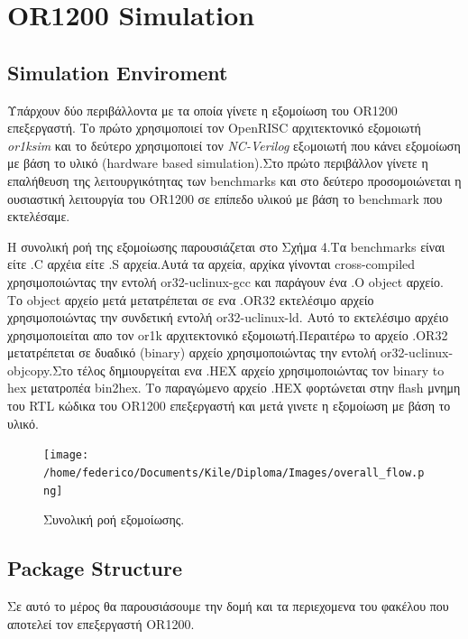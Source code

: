 \documentclass[a4paper,10pt]{article}
\numberwithin{figure}{subsection}
\numberwithin{table}{subsection}
\begin{document}
\section{OR1200 Simulation}{

\subsection{Simulation Enviroment}{
Υπάρχουν δύο περιβάλλοντα με τα οποία γίνετε η εξομοίωση του OR1200 επεξεργαστή.
Το πρώτο χρησιμοποιεί τον OpenRISC αρχιτεκτονικό εξομοιωτή \emph{or1ksim} και 
το δεύτερο χρησιμοποιεί τον \emph{NC-Verilog} εξoμοιωτή που κάνει εξομοίωση με βάση
το υλικό (hardware based simulation).Στο πρώτο περιβάλλον γίνετε η επαλήθευση
της λειτουργικότητας των benchmarks και στο δεύτερο προσομοιώνεται η ουσιαστική
λειτουργία του OR1200 σε επίπεδο υλικού με βάση το benchmark που εκτελέσαμε.\newline


Η συνολική ροή της εξομοίωσης παρουσιάζεται στο Σχήμα 4.Τα benchmarks είναι 
είτε .C αρχέια είτε .S αρχεία.Αυτά τα αρχεία, αρχίκα γίνονται cross-compiled
 χρησιμοποιώντας την εντολή or32-uclinux-gcc και παράγουν ένα .O object αρχείο.
Το object αρχείο μετά μετατρέπεται σε ενα .OR32 εκτελέσιμο αρχείο χρησιμοποιώντας
την συνδετική εντολή or32-uclinux-ld. Αυτό το εκτελέσιμο αρχέιο χρησιμοποιείται
απο τον or1k αρχιτεκτονικό εξομοιωτή.Περαιτέρω το αρχείο .OR32 μετατρέπεται σε
δυαδικό (binary) αρχείο χρησιμοποιώντας την εντολή or32-uclinux-objcopy.Στο τέλος
δημιουργείται ενα .HEX αρχείο χρησιμοποιώντας τον binary to hex μετατροπέα
 bin2hex. Το παραγώμενο αρχείο .HEX φορτώνεται στην flash μνημη του RTL κώδικα
του OR1200 επεξεργαστή και μετά γινετε η εξομοίωση με βάση το υλικό.
 
\begin{figure}[h!]
 \centering
 \texttt{[image: /home/federico/Documents/Kile/Diploma/Images/overall\_flow.png]}
 \caption{Συνολική ροή εξομοίωσης.}
\end{figure}


}



\subsection{Package Structure}{
Σε αυτό το μέρος θα παρουσιάσουμε την δομή και τα περιεχομενα του φακέλου που αποτελεί 
τον επεξεργαστή OR1200.

}}
\end{document}

